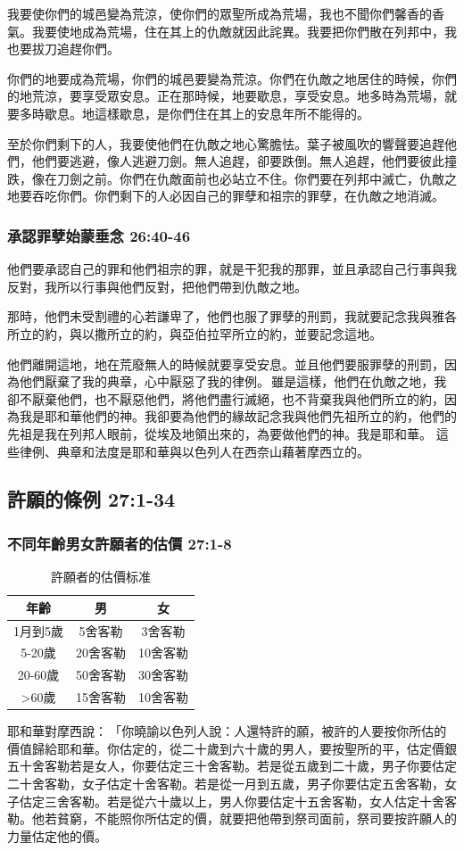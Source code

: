 我要使你們的城邑變為荒涼，使你們的眾聖所成為荒場，我也不聞你們馨香的香氣。我要使地成為荒場，住在其上的仇敵就因此詫異。我要把你們散在列邦中，我也要拔刀追趕你們。

你們的地要成為荒場，你們的城邑要變為荒涼。你們在仇敵之地居住的時候，你們的地荒涼，要享受眾安息。正在那時候，地要歇息，享受安息。地多時為荒場，就要多時歇息。地這樣歇息，是你們住在其上的安息年所不能得的。 

至於你們剩下的人，我要使他們在仇敵之地心驚膽怯。葉子被風吹的響聲要追趕他們，他們要逃避，像人逃避刀劍。無人追趕，卻要跌倒。無人追趕，他們要彼此撞跌，像在刀劍之前。你們在仇敵面前也必站立不住。你們要在列邦中滅亡，仇敵之地要吞吃你們。你們剩下的人必因自己的罪孽和祖宗的罪孽，在仇敵之地消滅。

\subsubsection{承認罪孽始蒙垂念 26:40-46}
他們要承認自己的罪和他們祖宗的罪，就是干犯我的那罪，並且承認自己行事與我反對，我所以行事與他們反對，把他們帶到仇敵之地。

那時，他們未受割禮的心若謙卑了，他們也服了罪孽的刑罰，我就要記念我與雅各所立的約，與以撒所立的約，與亞伯拉罕所立的約，並要記念這地。

他們離開這地，地在荒廢無人的時候就要享受安息。並且他們要服罪孽的刑罰，因為他們厭棄了我的典章，心中厭惡了我的律例。 雖是這樣，他們在仇敵之地，我卻不厭棄他們，也不厭惡他們，將他們盡行滅絕，也不背棄我與他們所立的約，因為我是耶和華他們的神。我卻要為他們的緣故記念我與他們先祖所立的約，他們的先祖是我在列邦人眼前，從埃及地領出來的，為要做他們的神。我是耶和華。
這些律例、典章和法度是耶和華與以色列人在西奈山藉著摩西立的。

\subsection{ 許願的條例 27:1-34}
\subsubsection{不同年齡男女許願者的估價 27:1-8}
\begin{table}
\vspace*{-8mm}
\centering
\begin{tabular}{c|c|c}
\hline
\hline
   年齡&男  & 女   \\ \hline
1月到5歲& 5舍客勒 & 3舍客勒  \\ 
5-20歲&20舍客勒 & 10舍客勒\\ 
20-60歲 &  50舍客勒 & 30舍客勒 \\ 
>60歲  &15舍客勒&10舍客勒   \\\hline
\end{tabular}
\caption{許願者的估價标准}
\end{table}
耶和華對摩西說： 「你曉諭以色列人說：人還特許的願，被許的人要按你所估的價值歸給耶和華。你估定的，從二十歲到六十歲的男人，要按聖所的平，估定價銀五十舍客勒若是女人，你要估定三十舍客勒。若是從五歲到二十歲，男子你要估定二十舍客勒，女子估定十舍客勒。若是從一月到五歲，男子你要估定五舍客勒，女子估定三舍客勒。若是從六十歲以上，男人你要估定十五舍客勒，女人估定十舍客勒。他若貧窮，不能照你所估定的價，就要把他帶到祭司面前，祭司要按許願人的力量估定他的價。

